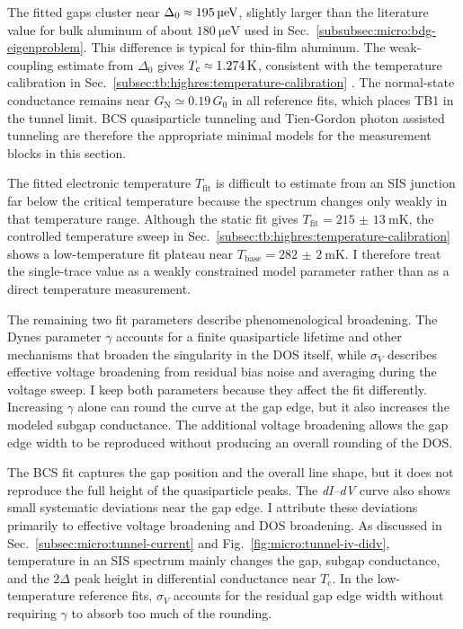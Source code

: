     The fitted gaps cluster near $\Delta_0\sapprox\qty{195}{\micro\electronvolt}$, slightly larger than the literature value for bulk aluminum of about $\qty{180}{\micro\electronvolt}$ used in Sec.~\ref{subsubsec:micro:bdg-eigenproblem}. This difference is typical for thin-film aluminum. The weak-coupling estimate from $\Delta_0$ gives $T_\mathrm{c}\sapprox\qty{1.274}{\kelvin}$, consistent with the temperature calibration in Sec.~\ref{subsec:tb:highres:temperature-calibration} \cite{giaever_study_1961,tinkham_introduction_2004}. The normal-state conductance remains near $G_\mathrm{N}\simeq0.19\,G_0$ in all reference fits, which places TB1 in the tunnel limit. BCS quasiparticle tunneling and Tien-Gordon photon assisted tunneling are therefore the appropriate minimal models for the measurement blocks in this section.

    The fitted electronic temperature $T_\mathrm{fit}$ is difficult to estimate from an SIS junction far below the critical temperature because the spectrum changes only weakly in that temperature range. Although the static fit gives $T_\mathrm{fit}=\qty{215(13)}{\milli\kelvin}$, the controlled temperature sweep in Sec.~\ref{subsec:tb:highres:temperature-calibration} shows a low-temperature fit plateau near $T_\mathrm{base}=\qty{282(2)}{\milli\kelvin}$. I therefore treat the single-trace value as a weakly constrained model parameter rather than as a direct temperature measurement.

    The remaining two fit parameters describe phenomenological broadening. The Dynes parameter $\gamma$ accounts for a finite quasiparticle lifetime and other mechanisms that broaden the singularity in the DOS itself, while $\sigma_V$ describes effective voltage broadening from residual bias noise and averaging during the voltage sweep. I keep both parameters because they affect the fit differently. Increasing $\gamma$ alone can round the curve at the gap edge, but it also increases the modeled subgap conductance. The additional voltage broadening allows the gap edge width to be reproduced without producing an overall rounding of the DOS.

    The BCS fit captures the gap position and the overall line shape, but it does not reproduce the full height of the quasiparticle peaks. The \textit{dI--dV} curve also shows small systematic deviations near the gap edge. I attribute these deviations primarily to effective voltage broadening and DOS broadening. As discussed in Sec.~\ref{subsec:micro:tunnel-current} and Fig.~\ref{fig:micro:tunnel-iv-didv}, temperature in an SIS spectrum mainly changes the gap, subgap conductance, and the $2\Delta$ peak height in differential conductance near $T_\mathrm{c}$. In the low-temperature reference fits, $\sigma_V$ accounts for the residual gap edge width without requiring $\gamma$ to absorb too much of the rounding.

